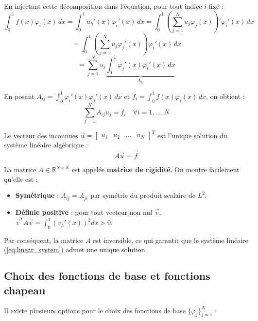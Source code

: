 En injectant cette décomposition dans l'équation, pour tout indice $i$ fixé :
$$\int_{0}^{1} f(x)\varphi_i(x) \, dx = \int_{0}^{1} u_h'(x) \varphi_i'(x) \, dx = \int_{0}^{1} \left( \sum_{j=1}^{N} u_j \varphi_j(x) \right)' \varphi_i'(x) \, dx$$
$$= \int_{0}^{1} \left( \sum_{j=1}^{N} u_j \varphi_j'(x) \right) \varphi_i'(x) \, dx$$
$$= \sum_{j=1}^{N} u_j \underbrace{\int_{0}^{1} \varphi_j'(x) \varphi_i'(x) \, dx}_{A_{ij}}$$

En posant $A_{ij} = \int_{0}^{1} \varphi_i'(x) \varphi_j'(x) \, dx$ et $f_i = \int_{0}^{1} f(x) \varphi_i(x) \, dx$, on obtient :
$$\sum_{j=1}^{N} A_{ij} u_j = f_i \quad \forall i = 1, \dots, N$$

Le vecteur des inconnues $\vec{u} = \begin{bmatrix} u_1 & u_2 & \dots & u_N \end{bmatrix}^T$ est l'unique solution du système linéaire algébrique :
\begin{equation}
A \vec{u} = \vec{f}
\label{eq:linear_system}
\end{equation}

\begin{proposition}
La matrice $A \in \mathbb{R}^{N \times N}$ est appelée \textbf{matrice de rigidité}. On montre facilement qu'elle est :
\begin{itemize}
    \item \textbf{Symétrique} : $A_{ij} = A_{ji}$ par symétrie du produit scalaire de $L^2$.
    \item \textbf{Définie positive} : pour tout vecteur non nul $\vec{v}$, $\vec{v}^T A \vec{v} = \int_0^1 (v_h'(x))^2 dx > 0$.
\end{itemize}
Par conséquent, la matrice $A$ est inversible, ce qui garantit que le système linéaire (\ref{eq:linear_system}) admet une unique solution.
\end{proposition}

\subsection{Choix des fonctions de base et fonctions chapeau}

Il existe plusieurs options pour le choix des fonctions de base $\{\varphi_j\}_{j=1}^N$ :

